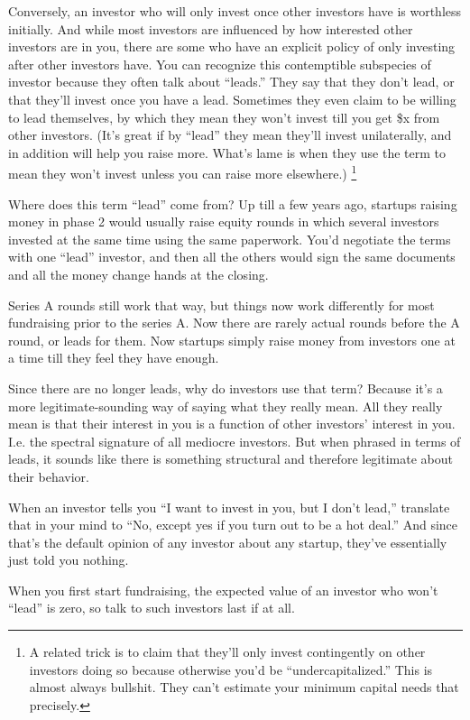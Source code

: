 Conversely, an investor who will only invest once other investors have
is worthless initially. And while most investors are influenced by how
interested other investors are in you, there are some who have an
explicit policy of only investing after other investors have. You can
recognize this contemptible subspecies of investor because they often
talk about ``leads.'' They say that they don't lead, or that they'll
invest once you have a lead. Sometimes they even claim to be willing to
lead themselves, by which they mean they won't invest till you get \$x
from other investors. (It's great if by ``lead'' they mean they'll
invest unilaterally, and in addition will help you raise more. What's
lame is when they use the term to mean they won't invest unless you can
raise more elsewhere.) \footnote{A related trick is to claim that they'll only invest
contingently on other investors doing so because otherwise you'd be
``undercapitalized.'' This is almost always bullshit. They can't
estimate your minimum capital needs that precisely.}

Where does this term ``lead'' come from? Up till a few years ago,
startups raising money in phase 2 would usually raise equity rounds in
which several investors invested at the same time using the same
paperwork. You'd negotiate the terms with one ``lead'' investor, and
then all the others would sign the same documents and all the money
change hands at the closing.

Series A rounds still work that way, but things now work differently for
most fundraising prior to the series A. Now there are rarely actual
rounds before the A round, or leads for them. Now startups simply raise
money from investors one at a time till they feel they have enough.

Since there are no longer leads, why do investors use that term? Because
it's a more legitimate-sounding way of saying what they really mean. All
they really mean is that their interest in you is a function of other
investors' interest in you. I.e. the spectral signature of all mediocre
investors. But when phrased in terms of leads, it sounds like there is
something structural and therefore legitimate about their behavior.

When an investor tells you ``I want to invest in you, but I don't
lead,'' translate that in your mind to ``No, except yes if you turn out
to be a hot deal.'' And since that's the default opinion of any investor
about any startup, they've essentially just told you nothing.

When you first start fundraising, the expected value of an investor who
won't ``lead'' is zero, so talk to such investors last if at all.

